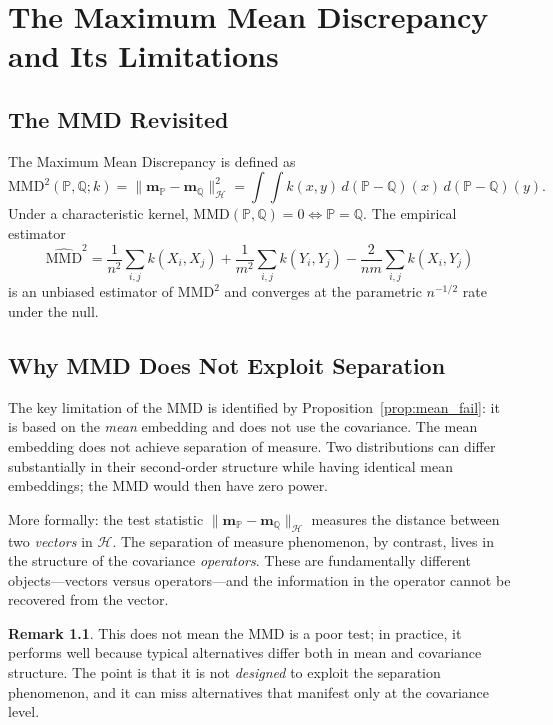 \documentclass[12pt, oneside]{book}
\theoremstyle{plain}
\theoremstyle{definition}
\newtheorem{remark}[theorem]{Remark}
\newcommand{\calH}{\mathcal{H}}
\newcommand{\PP}{\mathbb{P}}
\newcommand{\QQ}{\mathbb{Q}}
\newcommand{\mP}{\mathbf{m}_{\PP}}
\newcommand{\mQ}{\mathbf{m}_{\QQ}}
\newcommand{\MMD}{\mathrm{MMD}}
\begin{document}
\chapter{The Maximum Mean Discrepancy and Its Limitations}
\label{chap:mmd}

\section{The MMD Revisited}

The Maximum Mean Discrepancy is defined as
\begin{equation}
\MMD^2(\PP, \QQ; k) = \|\mP - \mQ\|_{\calH}^2 = \int\!\!\int k(x,y)\, d(\PP - \QQ)(x)\, d(\PP - \QQ)(y).
\end{equation}
Under a characteristic kernel, $\MMD(\PP, \QQ) = 0 \iff \PP = \QQ$. The empirical estimator
\begin{equation}
\widehat{\MMD}^2 = \frac{1}{n^2} \sum_{i,j} k(X_i, X_j) + \frac{1}{m^2}\sum_{i,j} k(Y_i, Y_j) - \frac{2}{nm}\sum_{i,j} k(X_i, Y_j)
\end{equation}
is an unbiased estimator of $\MMD^2$ and converges at the parametric $n^{-1/2}$ rate under the null.

\section{Why MMD Does Not Exploit Separation}

The key limitation of the MMD is identified by Proposition~\ref{prop:mean_fail}: it is based on the \emph{mean} embedding and does not use the covariance. The mean embedding does not achieve separation of measure. Two distributions can differ substantially in their second-order structure while having identical mean embeddings; the MMD would then have zero power.

More formally: the test statistic $\|\mP - \mQ\|_{\calH}$ measures the distance between two \emph{vectors} in $\calH$. The separation of measure phenomenon, by contrast, lives in the structure of the covariance \emph{operators}. These are fundamentally different objects---vectors versus operators---and the information in the operator cannot be recovered from the vector.

\begin{remark}
This does not mean the MMD is a poor test; in practice, it performs well because typical alternatives differ both in mean and covariance structure. The point is that it is not \emph{designed} to exploit the separation phenomenon, and it can miss alternatives that manifest only at the covariance level.
\end{remark}
\end{document}
